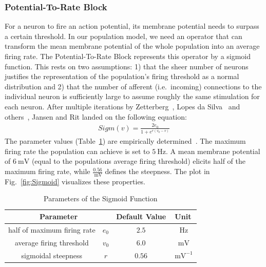 \subsubsection{Potential-To-Rate Block}
For a neuron to fire an action potential, its membrane potential needs to surpass a certain threshold.
In our population model, we need an operator that can transform
the mean membrane potential of the whole population into an average firing rate.
The Potential-To-Rate Block represents this operator by a sigmoid function.
This rests on two assumptions:
1) that the sheer number of neurons justifies the representation of the population's
firing threshold as a normal distribution and
2) that the number of afferent (i.e.\ incoming) connections to the individual neuron is sufficiently large
to assume roughly the same stimulation for each neuron.
After multiple iterations by Zetterberg~\cite{zetterberg_performance_1978},
Lopes da Silva~\cite{lopes_da_silva_models_1976} and others~\cite{van_rotterdam_model_1982},
Jansen and Rit landed on the following equation:
\begin{align}
    Sigm(v) = \frac{2e_0}{1+e^{r(v_0-v)}} \label{eq:SigmJansenRit}
\end{align}
The parameter values (Table~\ref{tab:sigmoid_params}) are empirically
determined~\parencite{jansen_neurophysiologically-based_1993}.
The maximum firing rate the population can achieve is set to $\SI{5}{\hertz}$.
A mean membrane potential of $\SI{6}{\milli\volt}$ (equal to the populations average firing threshold) elicits half
of the maximum firing rate, while $\frac{0.56}{\SI{}{\milli\volt}}$ defines the steepness.
The plot in Fig.~\ref{fig:Sigmoid} visualizes these properties.
\begin{table}[H]
    \centering
    \begin{tabular}{ |c|c|c|c| }
        \hline
        \multicolumn{2}{|c|}{Parameter} & Default Value & Unit \\
        \hline
        \hline
        half of maximum firing rate & \(e_0\) & \(2.5\)  & \(\SI{}{\hertz}\)      \\
        \hline
        average firing threshold    & \(v_0\) & \(6.0\)  & \(\SI{}{\milli\volt}\)      \\
        \hline
        sigmoidal steepness         & \(r\)   & \(0.56\) & \(\SI{}{\milli\volt}^{-1}\) \\
        \hline
    \end{tabular}
    \caption{Parameters of the Sigmoid Function}
    \label{tab:sigmoid_params}
\end{table}

